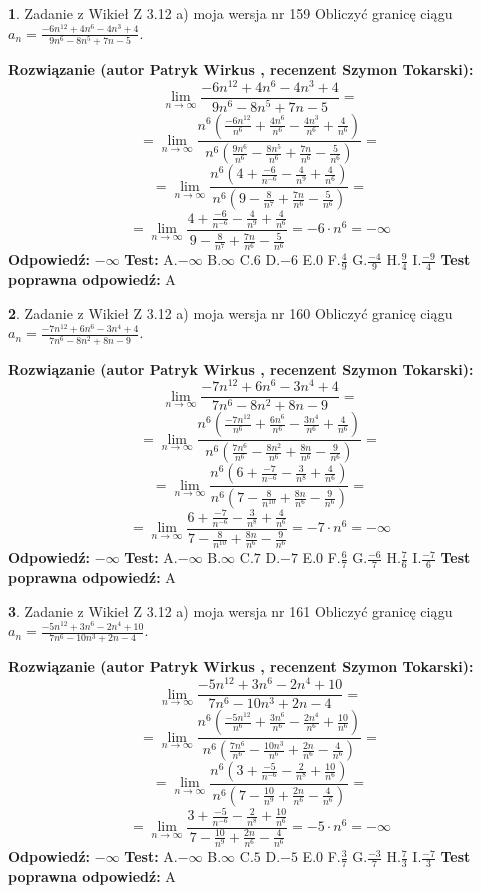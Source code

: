 \documentclass[12pt, a4paper]{article}
\theoremstyle{definition} %
\newtheorem{zad}{}
\newcommand{\zadStart}[1]{\begin{zad}#1\newline}
\newcommand{\zadStop}{\end{zad}}
\newcommand{\rozwStart}[2]{\noindent \textbf{Rozwiązanie (autor #1 , recenzent #2): }\newline}
\newcommand{\rozwStop}{\newline}
\newcommand{\odpStart}{\noindent \textbf{Odpowiedź:}\newline}
\newcommand{\odpStop}{\newline}
\newcommand{\testStart}{\noindent \textbf{Test:}\newline}
\newcommand{\testStop}{\newline}
\newcommand{\kluczStart}{\noindent \textbf{Test poprawna odpowiedź:}\newline}
\newcommand{\kluczStop}{\newline}
\begin{document}
\zadStart{Zadanie z Wikieł Z 3.12 a) moja wersja nr 159}
Obliczyć granicę ciągu $a_{n}=\frac{-6n^{12}+4n^{6}-4n^{3}+4}{9n^{6}-8n^{5}+7n-5}$.
\zadStop
\rozwStart{Patryk Wirkus}{Szymon Tokarski}
$$\lim\limits_{n\to\infty}\frac{-6n^{12}+4n^{6}-4n^{3}+4}{9n^{6}-8n^{5}+7n-5}=$$
$$=\lim\limits_{n\to\infty}\frac{n^{6}\left(\frac{-6n^{12}}{n^{6}}+\frac{4n^{6}}{n^{6}}-\frac{4n^{3}}{n^{6}}+\frac{4}{n^{6}}\right)}{n^{6}\left(\frac{9n^{6}}{n^{6}}-\frac{8n^{5}}{n^{6}}+\frac{7n}{n^{6}}-\frac{5}{n^{6}}\right)}=$$
$$=\lim\limits_{n\to\infty}\frac{n^{6}\left(4+\frac{-6}{n^{-6}}-\frac{4}{n^{9}}+\frac{4}{n^{6}}\right)}
{n^{6}\left(9-\frac{8}{n^{7}}+\frac{7n}{n^{6}}-\frac{5}{n^{6}}\right)}=$$
$$=\lim\limits_{n\to\infty}\frac{4+\frac{-6}{n^{-6}}-\frac{4}{n^{9}}+\frac{4}{n^{6}}}{9-\frac{8}{n^{7}}+\frac{7n}{n^{6}}-\frac{5}{n^{6}}}=-6\cdot n^{6} = -\infty$$
\rozwStop
\odpStart
$-\infty$
\odpStop
\testStart
A.$-\infty$
B.$\infty$
C.$6$
D.$-6$
E.$0$
F.$\frac{4}{9}$
G.$\frac{-4}{9}$
H.$\frac{9}{4}$
I.$\frac{-9}{4}$
\testStop
\kluczStart
A
\kluczStop



\zadStart{Zadanie z Wikieł Z 3.12 a) moja wersja nr 160}
Obliczyć granicę ciągu $a_{n}=\frac{-7n^{12}+6n^{6}-3n^{4}+4}{7n^{6}-8n^{2}+8n-9}$.
\zadStop
\rozwStart{Patryk Wirkus}{Szymon Tokarski}
$$\lim\limits_{n\to\infty}\frac{-7n^{12}+6n^{6}-3n^{4}+4}{7n^{6}-8n^{2}+8n-9}=$$
$$=\lim\limits_{n\to\infty}\frac{n^{6}\left(\frac{-7n^{12}}{n^{6}}+\frac{6n^{6}}{n^{6}}-\frac{3n^{4}}{n^{6}}+\frac{4}{n^{6}}\right)}{n^{6}\left(\frac{7n^{6}}{n^{6}}-\frac{8n^{2}}{n^{6}}+\frac{8n}{n^{6}}-\frac{9}{n^{6}}\right)}=$$
$$=\lim\limits_{n\to\infty}\frac{n^{6}\left(6+\frac{-7}{n^{-6}}-\frac{3}{n^{8}}+\frac{4}{n^{6}}\right)}
{n^{6}\left(7-\frac{8}{n^{10}}+\frac{8n}{n^{6}}-\frac{9}{n^{6}}\right)}=$$
$$=\lim\limits_{n\to\infty}\frac{6+\frac{-7}{n^{-6}}-\frac{3}{n^{8}}+\frac{4}{n^{6}}}{7-\frac{8}{n^{10}}+\frac{8n}{n^{6}}-\frac{9}{n^{6}}}=-7\cdot n^{6} = -\infty$$
\rozwStop
\odpStart
$-\infty$
\odpStop
\testStart
A.$-\infty$
B.$\infty$
C.$7$
D.$-7$
E.$0$
F.$\frac{6}{7}$
G.$\frac{-6}{7}$
H.$\frac{7}{6}$
I.$\frac{-7}{6}$
\testStop
\kluczStart
A
\kluczStop



\zadStart{Zadanie z Wikieł Z 3.12 a) moja wersja nr 161}
Obliczyć granicę ciągu $a_{n}=\frac{-5n^{12}+3n^{6}-2n^{4}+10}{7n^{6}-10n^{3}+2n-4}$.
\zadStop
\rozwStart{Patryk Wirkus}{Szymon Tokarski}
$$\lim\limits_{n\to\infty}\frac{-5n^{12}+3n^{6}-2n^{4}+10}{7n^{6}-10n^{3}+2n-4}=$$
$$=\lim\limits_{n\to\infty}\frac{n^{6}\left(\frac{-5n^{12}}{n^{6}}+\frac{3n^{6}}{n^{6}}-\frac{2n^{4}}{n^{6}}+\frac{10}{n^{6}}\right)}{n^{6}\left(\frac{7n^{6}}{n^{6}}-\frac{10n^{3}}{n^{6}}+\frac{2n}{n^{6}}-\frac{4}{n^{6}}\right)}=$$
$$=\lim\limits_{n\to\infty}\frac{n^{6}\left(3+\frac{-5}{n^{-6}}-\frac{2}{n^{8}}+\frac{10}{n^{6}}\right)}
{n^{6}\left(7-\frac{10}{n^{9}}+\frac{2n}{n^{6}}-\frac{4}{n^{6}}\right)}=$$
$$=\lim\limits_{n\to\infty}\frac{3+\frac{-5}{n^{-6}}-\frac{2}{n^{8}}+\frac{10}{n^{6}}}{7-\frac{10}{n^{9}}+\frac{2n}{n^{6}}-\frac{4}{n^{6}}}=-5\cdot n^{6} = -\infty$$
\rozwStop
\odpStart
$-\infty$
\odpStop
\testStart
A.$-\infty$
B.$\infty$
C.$5$
D.$-5$
E.$0$
F.$\frac{3}{7}$
G.$\frac{-3}{7}$
H.$\frac{7}{3}$
I.$\frac{-7}{3}$
\testStop
\kluczStart
A
\kluczStop
\end{document}
